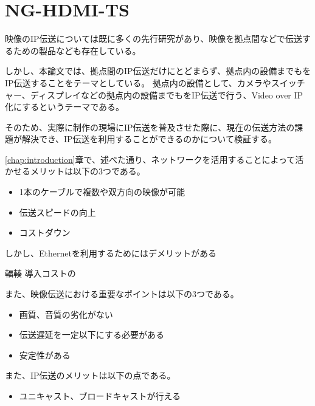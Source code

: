 \chapter{NG-HDMI-TS}
\label{chap:network-transmission}

映像のIP伝送については既に多くの先行研究があり、映像を拠点間などで伝送するための製品なども存在している。

しかし、本論文では、拠点間のIP伝送だけにとどまらず、拠点内の設備までもをIP伝送することをテーマとしている。
拠点内の設備として、カメラやスイッチャー、ディスプレイなどの拠点内の設備までもをIP伝送で行う、Video over IP化にするというテーマである。

そのため、実際に制作の現場にIP伝送を普及させた際に、現在の伝送方法の課題が解決でき、IP伝送を利用することができるのかについて検証する。


\ref{chap:introduction}章で、述べた通り、ネットワークを活用することによって活かせるメリットは以下の3つである。

\begin{itemize}
  \item 1本のケーブルで複数や双方向の映像が可能
  \item 伝送スピードの向上
  \item コストダウン
\end{itemize}

しかし、Ethernetを利用するためにはデメリットがある

輻輳
導入コストの

また、映像伝送における重要なポイントは以下の3つである。

\begin{itemize}
  \item 画質、音質の劣化がない
  \item 伝送遅延を一定以下にする必要がある
  \item 安定性がある
\end{itemize}

また、IP伝送のメリットは以下の点である。

\begin{itemize}
  \item ユニキャスト、ブロードキャストが行える
\end{itemize}

